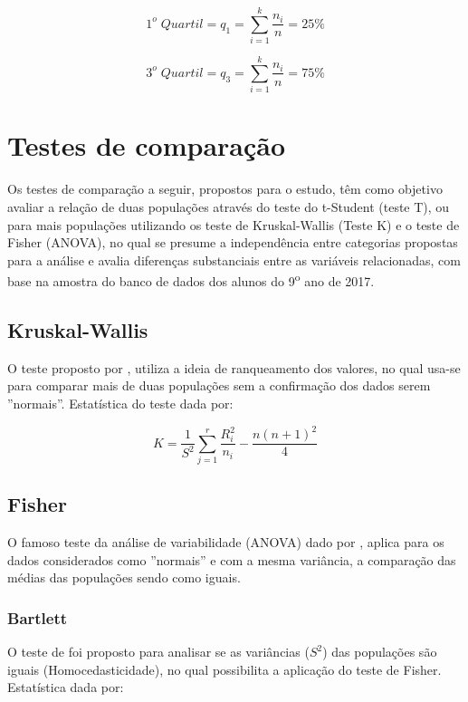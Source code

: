 \begin{equation}
    1^o \; Quartil = q_1 = \sum_{i=1}^{k} \frac{n_i}{n} = 25\%
\end{equation}

\begin{equation}
    3^o \; Quartil = q_3 = \sum_{i=1}^{k} \frac{n_i}{n} = 75\%
\end{equation}



\section{Testes de comparação}

Os testes de comparação a seguir, propostos para o estudo, têm como objetivo
avaliar a relação de duas populações através do teste do t-Student (teste T), ou
para mais populações utilizando os teste de Kruskal-Wallis (Teste K) e o
teste de Fisher (ANOVA), no qual se presume a independência entre categorias
propostas para a análise e avalia diferenças substanciais entre as variáveis
relacionadas, com base na amostra do banco de dados dos alunos do
9\textsuperscript{o} ano de 2017.

\subsection{Kruskal-Wallis} 

O teste proposto por , utiliza a ideia de ranqueamento dos valores, no qual usa-se para comparar mais de duas populações sem a confirmação dos dados serem ''normais''. Estatística do teste dada por:

$$K = \frac{1}{S^2} \sum^r_{j=1} \frac{R^2_i}{n_i} - \frac{n(n+1)^2}{4}$$

\subsection{Fisher}

O famoso teste da análise de variabilidade (ANOVA) dado por , aplica para os dados considerados como ''normais'' e com a mesma variância, a comparação das médias das populações sendo como iguais.

\subsubsection{Bartlett}

O teste de  foi proposto para analisar se as variâncias ($S^2$) das populações são iguais (Homocedasticidade), no qual possibilita a aplicação do teste de Fisher. Estatística dada por:


